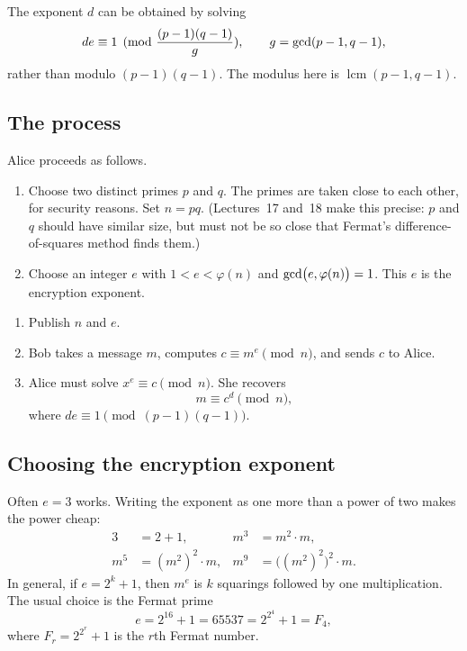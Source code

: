 \begin{remark}
The exponent \(d\) can be obtained by solving
\[
    de\equiv 1\pmod{\frac{(p-1)(q-1)}{g}},
    \qquad g=\operatorname{gcd}(p-1,q-1),
\]
rather than modulo \((p-1)(q-1)\). The modulus here is \(\operatorname{lcm}(p-1,q-1)\).
\end{remark}

\subsection{The process}
\begin{keybox}[title=The RSA cryptosystem]
Alice proceeds as follows.
\begin{enumerate}[leftmargin=1.6em]
    \item Choose two distinct primes \(p\) and \(q\). The primes are taken close to each other, for security reasons. Set \(n=pq\). (Lectures~17 and~18 make this precise: \(p\) and \(q\) should have similar size, but must not be so close that Fermat's difference-of-squares method finds them.)
    \item Choose an integer \(e\) with \(1<e<\varphi(n)\) and \(\operatorname{gcd}\bigl(e,\varphi(n)\bigr)=1\). This \(e\) is the encryption exponent.
\end{enumerate}


\begin{enumerate}[leftmargin=1.6em, resume]
    \item Publish \(n\) and \(e\).
    \item Bob takes a message \(m\), computes \(c\equiv m^{e}\pmod{n}\), and sends \(c\) to Alice.
    \item Alice must solve \(x^{e}\equiv c\pmod{n}\). She recovers
    \[
        m\equiv c^{d}\pmod{n},
    \]
    where \(de\equiv 1\pmod{(p-1)(q-1)}\).
\end{enumerate}
\end{keybox}

\subsection{Choosing the encryption exponent}
Often \(e=3\) works. Writing the exponent as one more than a power of two makes the power cheap:
\begin{align*}
    3&=2+1, & m^{3}&=m^{2}\cdot m,\\
    m^{5}&=(m^{2})^{2}\cdot m, &
    m^{9}&=\bigl((m^{2})^{2}\bigr)^{2}\cdot m.
\end{align*}
In general, if \(e=2^{k}+1\), then \(m^{e}\) is \(k\) squarings followed by one multiplication. The usual choice is the Fermat prime
\[
    e=2^{16}+1=65537=2^{2^{4}}+1=F_{4},
\]
where \(F_{r}=2^{2^{r}}+1\) is the \(r\)th Fermat number.

